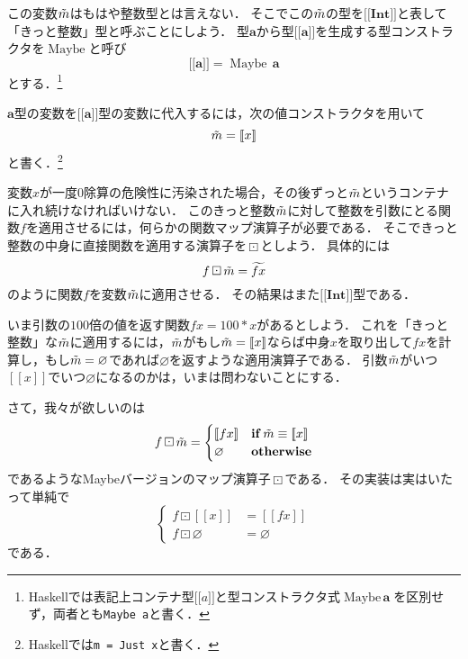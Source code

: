 \documentclass[twocolumn]{jsbook}
\def\[{[\![}
\def\]{]\!]}
\newcommand{\code}[1]{\texttt{#1}}
\newcommand{\hsklType}[1]{\textbf{#1}}
\newcommand{\hsklTypeConstructor}[1]{\mathop{\mathrm{#1}}}
\DeclareMathOperator{\hsklMaybeConstructor}{\hsklTypeConstructor{Maybe}}
\DeclareMathOperator{\hsklMaybeMap}{\boxdot}
\newcommand{\hsklInt}{\hsklType{Int}}
\newcommand{\hsklNothing}{\varnothing}
\newcommand{\hsklJust}[1]{\[#1\]}
\newcommand{\hsklMaybe}[1]{\Tilde{#1}}
\newcommand{\hsklMaybeW}[1]{\widetilde{#1}}
\newcommand{\hsklMaybeType}[1]{\boldsymbol{\[}#1\boldsymbol{\]}}
\newcommand{\hsklTypeConstruct}[2]{#1\,#2}
\newcommand{\mathKeyword}[1]{\mathbf{#1}}
\DeclareMathOperator{\mathIf}{\mathKeyword{if}}
\newcommand{\mathOtherwise}{\mathKeyword{otherwise}}
\begin{document}
この変数$\hsklMaybe{m}$はもはや整数型とは言えない．
そこでこの$\hsklMaybe{m}$の型を$\hsklMaybeType{\hsklInt}$と表して「きっと整数」型と呼ぶことにしよう．
型$\hsklType{a}$から型$\hsklMaybeType{\hsklType{a}}$を生成する型コンストラクタを$\hsklMaybeConstructor$と呼び$$\hsklMaybeType{\hsklType{a}}=\hsklTypeConstruct{\hsklMaybeConstructor}{\hsklType{a}}$$とする．\footnote{Haskellでは表記上コンテナ型$\hsklMaybeType{a}$と型コンストラクタ式$\hsklTypeConstruct{\hsklMaybeConstructor}{\hsklType{a}}$を区別せず，両者とも\code{Maybe a}と書く．}

$\hsklType{a}$型の変数を$\hsklMaybeType{\hsklType{a}}$型の変数に代入するには，次の値コンストラクタを用いて
$$\hsklMaybe{m}=\hsklJust{x}$$
と書く．\footnote{Haskellでは\code{m = Just x}と書く．}

変数$x$が一度$0$除算の危険性に汚染された場合，その後ずっと$\hsklMaybe{m}$というコンテナに入れ続けなければいけない．
このきっと整数$\hsklMaybe{m}$に対して整数を引数にとる関数$f$を適用させるには，何らかの関数マップ演算子が必要である．
そこできっと整数の中身に直接関数を適用する演算子を$\hsklMaybeMap$としよう．
具体的には$$f\hsklMaybeMap\hsklMaybe{m}=\hsklMaybeW{fx}$$のように関数$f$を変数$\hsklMaybe{m}$に適用させる．
その結果はまた$\hsklMaybeType{\hsklInt}$型である．

いま引数の$100$倍の値を返す関数$fx=100*x$があるとしよう．
これを「きっと整数」な$\hsklMaybe{m}$に適用するには，$\hsklMaybe{m}$がもし$\hsklMaybe{m}=\hsklJust{x}$ならば中身$x$を取り出して$fx$を計算し，もし$\hsklMaybe{m}=\hsklNothing$であれば$\hsklNothing$を返すような適用演算子である．
引数$\hsklMaybe{m}$がいつ$\hsklJust{x}$でいつ$\hsklNothing$になるのかは，いまは問わないことにする．

さて，我々が欲しいのは
\begin{equation*}
f\hsklMaybeMap\hsklMaybe{m}=\begin{cases}
\hsklJust{fx}&\mathIf\hsklMaybe{m}\equiv\hsklJust{x}\\
\hsklNothing&\mathOtherwise
\end{cases}
\end{equation*}
であるようなMaybeバージョンのマップ演算子$\hsklMaybeMap$である．
その実装は実はいたって単純で
\begin{equation*}
\left\{
\begin{split}
f\hsklMaybeMap\hsklJust{x}&=\hsklJust{fx}\\
f\hsklMaybeMap\hsklNothing&=\hsklNothing
\end{split}
\right.
\end{equation*}
である．
\end{document}
